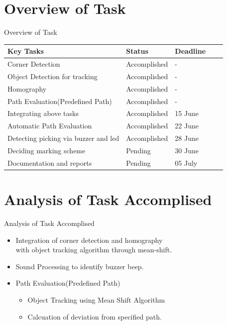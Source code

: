 \documentclass[10pt, a4paper]{beamer}
\begin{document}
\section{Overview of Task}
\begin{frame}{\begin{center}
			Overview of Task
		\end{center}}\vspace{-2cm}
	\begin{tabular}{|l|l|l|l|l|}
		\hline
		\textbf{Key Tasks} & \textbf{Status} & \textbf{Deadline}\\
		\hline
		Corner Detection & Accomplished & -\\
		\hline
		Object Detection for tracking & Accomplished & - \\
		\hline
		Homography & Accomplished & - \\
		\hline
		Path Evaluation(Predefined Path) & Accomplished & -\\
		\hline
		Integrating above tasks & Accomplished& 15 June\\
		\hline
		Automatic Path Evaluation& Accomplished & 22 June \\
		\hline
		Detecting picking via buzzer and led& Accomplished & 28 June \\
		\hline
		Deciding marking scheme & Pending & 30 June\\
		\hline
		Documentation and reports & Pending & 05 July\\
		\hline		
	\end{tabular}
\end{frame}

\section{Analysis of Task Accomplised}
\begin{frame}{\begin{center}
Analysis of Task Accomplised
		\end{center}}\vspace{-2cm}
	\begin{itemize}
		\item {Integration of corner detection and homography\\ with object tracking algorithm through mean-shift.}
		\item {Sound Processing to identify buzzer beep.}
		\item {Path Evaluation(Predefined Path)\\}
		\begin{itemize}
			\item {Object Tracking using Mean Shift Algorithm\\}
			\item {Calcuation of deviation from specified path.}
		\end{itemize}
	\end{itemize}
\end{frame}
\end{document}
